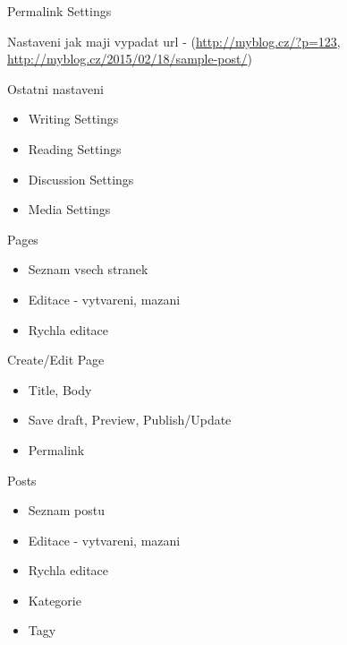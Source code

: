 \documentclass{beamer}
\begin{document}
\begin{frame}
    {Permalink Settings}

    Nastaveni jak maji vypadat url - (\url{http://myblog.cz/?p=123}, \url{http://myblog.cz/2015/02/18/sample-post/})
\end{frame}


\begin{frame}
    {Ostatni nastaveni}

    \begin{itemize}
        \item Writing Settings
        \item Reading Settings
        \item Discussion Settings
        \item Media Settings
    \end{itemize}
\end{frame}


\begin{frame}
    {Pages}

    \begin{itemize}
        \item Seznam vsech stranek
        \item Editace - vytvareni, mazani
        \item Rychla editace
    \end{itemize}
\end{frame}

\begin{frame}
    {Create/Edit Page}

    \begin{itemize}
        \item Title, Body
        \item Save draft, Preview, Publish/Update
        \item Permalink
    \end{itemize}
\end{frame}


\begin{frame}
    {Posts}

    \begin{itemize}
        \item Seznam postu
        \item Editace - vytvareni, mazani
        \item Rychla editace
        \item Kategorie
        \item Tagy
    \end{itemize}
\end{frame}
\end{document}
